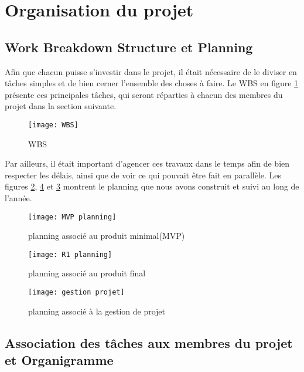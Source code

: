 \chapter*{Organisation du projet}
\label{sec:organisation}


\section*{Work Breakdown Structure et Planning}

Afin que chacun puisse s'investir dans le projet, il était nécessaire de le diviser en tâches simples et de bien cerner l'ensemble des choses à faire. Le WBS en figure \ref{fig:wbs} présente ces principales tâches, qui seront réparties à chacun des membres du projet dans la section suivante. 

\begin{figure}[!h]
	\centering
	\texttt{[image: WBS]}
	\caption{WBS}
	\label{fig:wbs}
\end{figure}


Par ailleurs, il était important d'agencer ces travaux dans le temps afin de bien respecter les délais, ainsi que de voir ce qui pouvait être fait en parallèle. Les figures \ref{fig:mvp-plan}, \ref{fig:gestion-proj} et \ref{fig:r1-plan} montrent le planning que nous avons construit et suivi au long de l'année.


\begin{figure}[!ht]
	\centering
	\texttt{[image: MVP planning]}
	\caption{planning associé au produit minimal(MVP)}
	\label{fig:mvp-plan}
\end{figure}

\begin{figure}[!ht]
	\centering
	\texttt{[image: R1 planning]}
	\caption{planning associé au produit final}
	\label{fig:r1-plan}
\end{figure}

\begin{figure}[!ht]
	\centering
	\texttt{[image: gestion projet]}
	\caption{planning associé à la gestion de projet}
	\label{fig:gestion-proj}
\end{figure}

\section*{Association des tâches aux membres du projet et Organigramme}

